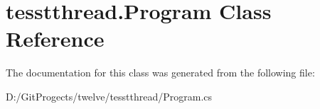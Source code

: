 \hypertarget{classtesstthread_1_1_program}{}\section{tesstthread.\+Program Class Reference}
\label{classtesstthread_1_1_program}


The documentation for this class was generated from the following file\+:\begin{DoxyCompactItemize}
\item 
D\+:/\+Git\+Progects/twelve/tesstthread/Program.\+cs\end{DoxyCompactItemize}
